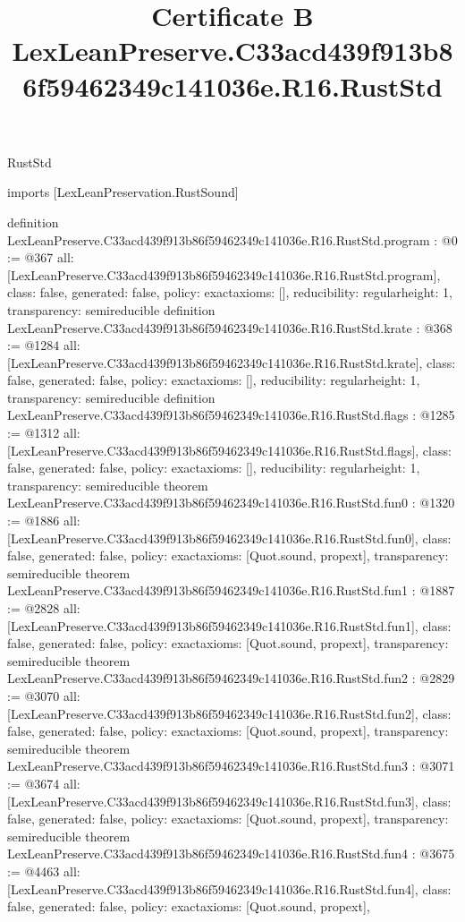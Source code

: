 \begin{lexlean}{RustStd}
\title{Certificate B LexLeanPreserve.C33acd439f913b86f59462349c141036e.R16.RustStd}
\begin{coremodule}
imports [LexLeanPreservation.RustSound]

definition LexLeanPreserve.C33acd439f913b86f59462349c141036e.R16.RustStd.program : @0 := @367 {
  all: [LexLeanPreserve.C33acd439f913b86f59462349c141036e.R16.RustStd.program],
  class: false,
  generated: false,
  policy: exact{axioms: []},
  reducibility: regular{height: 1},
  transparency: semireducible
}
definition LexLeanPreserve.C33acd439f913b86f59462349c141036e.R16.RustStd.krate : @368 := @1284 {
  all: [LexLeanPreserve.C33acd439f913b86f59462349c141036e.R16.RustStd.krate],
  class: false,
  generated: false,
  policy: exact{axioms: []},
  reducibility: regular{height: 1},
  transparency: semireducible
}
definition LexLeanPreserve.C33acd439f913b86f59462349c141036e.R16.RustStd.flags : @1285 := @1312 {
  all: [LexLeanPreserve.C33acd439f913b86f59462349c141036e.R16.RustStd.flags],
  class: false,
  generated: false,
  policy: exact{axioms: []},
  reducibility: regular{height: 1},
  transparency: semireducible
}
theorem LexLeanPreserve.C33acd439f913b86f59462349c141036e.R16.RustStd.fun0 : @1320 := @1886 {
  all: [LexLeanPreserve.C33acd439f913b86f59462349c141036e.R16.RustStd.fun0],
  class: false,
  generated: false,
  policy: exact{axioms: [Quot.sound, propext]},
  transparency: semireducible
}
theorem LexLeanPreserve.C33acd439f913b86f59462349c141036e.R16.RustStd.fun1 : @1887 := @2828 {
  all: [LexLeanPreserve.C33acd439f913b86f59462349c141036e.R16.RustStd.fun1],
  class: false,
  generated: false,
  policy: exact{axioms: [Quot.sound, propext]},
  transparency: semireducible
}
theorem LexLeanPreserve.C33acd439f913b86f59462349c141036e.R16.RustStd.fun2 : @2829 := @3070 {
  all: [LexLeanPreserve.C33acd439f913b86f59462349c141036e.R16.RustStd.fun2],
  class: false,
  generated: false,
  policy: exact{axioms: [Quot.sound, propext]},
  transparency: semireducible
}
theorem LexLeanPreserve.C33acd439f913b86f59462349c141036e.R16.RustStd.fun3 : @3071 := @3674 {
  all: [LexLeanPreserve.C33acd439f913b86f59462349c141036e.R16.RustStd.fun3],
  class: false,
  generated: false,
  policy: exact{axioms: [Quot.sound, propext]},
  transparency: semireducible
}
theorem LexLeanPreserve.C33acd439f913b86f59462349c141036e.R16.RustStd.fun4 : @3675 := @4463 {
  all: [LexLeanPreserve.C33acd439f913b86f59462349c141036e.R16.RustStd.fun4],
  class: false,
  generated: false,
  policy: exact{axioms: [Quot.sound, propext]},
}
\end{coremodule}
\end{lexlean}
